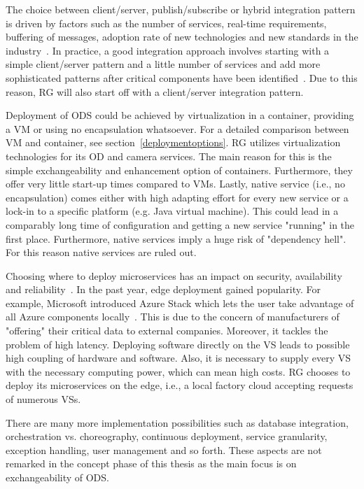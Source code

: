 The choice between client/server, publish/subscribe or hybrid integration pattern is driven by factors such as the number of services, real-time requirements, buffering of messages, adoption rate of new technologies and new standards in the industry~\cite{Bianco2007EvaluatingArchitecture}. In practice, a good integration approach involves starting with a simple client/server pattern and a little number of services and add more sophisticated patterns after critical components have been identified~\cite{Newman2015BuildingMicroservices}. Due to this reason, RG will also start off with a client/server integration pattern.

Deployment of ODS could be achieved by virtualization in a container, providing a VM or using no encapsulation whatsoever. For a detailed comparison between VM and container, see section~\ref{deploymentoptions}. RG utilizes virtualization technologies for its OD and camera services. The main reason for this is the simple exchangeability and enhancement option of containers. Furthermore, they offer very little start-up times compared to VMs. Lastly, native service (i.e., no encapsulation) comes either with high adapting effort for every new service or a lock-in to a specific platform (e.g. Java virtual machine). This could lead in a comparably long time of configuration and getting a new service "running" in the first place. Furthermore, native services imply a huge risk of "dependency hell". For this reason native services are ruled out.

Choosing where to deploy microservices has an impact on security, availability and reliability~\cite{Newman2015BuildingMicroservices}. In the past year, edge deployment gained popularity. For example, Microsoft introduced Azure Stack which lets the user take advantage of all Azure components locally~\cite{Azure-Documentation2019Was2019}. This is due to the concern of manufacturers of "offering" their critical data to external companies. Moreover, it tackles the problem of high latency. Deploying software directly on the VS leads to possible high coupling of hardware and software. Also, it is necessary to supply every VS with the necessary computing power, which can mean high costs. RG chooses to deploy its microservices on the edge, i.e., a local factory cloud accepting requests of numerous VSs.  

There are many more implementation possibilities such as database integration, orchestration vs. choreography, continuous deployment, service granularity, exception handling, user management and so forth. These aspects are not remarked in the concept phase of this thesis as the main focus is on exchangeability of ODS.

